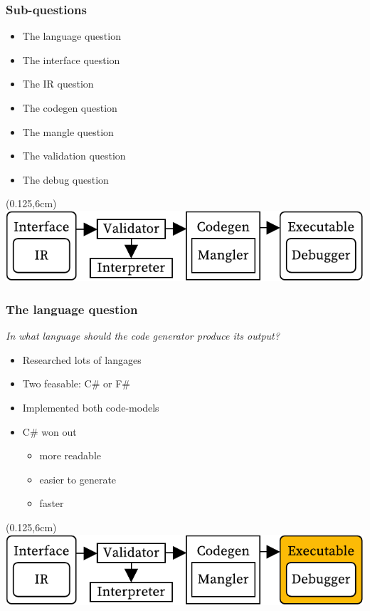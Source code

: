 \documentclass[xetex,serif]{beamer}
\begin{document}
\begin{frame}
\end{frame}\begin{frame}[t]\frametitle{Sub-questions}
\begin{itemize}
    \item The language question
    \item The interface question
    \item The IR question
    \item The codegen question
    \item The mangle question
    \item The validation question
    \item The debug question
\end{itemize}
\begin{textblock*}{0.75\paperwidth}(0.125\paperwidth,6cm)\includegraphics[width=0.75\paperwidth]{overview}\end{textblock*}

\end{frame}\begin{frame}[t]\frametitle{The language question}
\textit{In what language should the code generator produce its output?}
\begin{itemize}
    \item Researched lots of langages
    \item Two feasable: C\# or F\#
    \item Implemented both code-models
    \item C\# won out
    \begin{itemize}
        \item more readable
        \item easier to generate
        \item faster
    \end{itemize}
\end{itemize}
\begin{textblock*}{0.75\paperwidth}(0.125\paperwidth,6cm)\includegraphics[width=0.75\paperwidth]{overview_language}\end{textblock*}


\end{frame}
\end{document}
